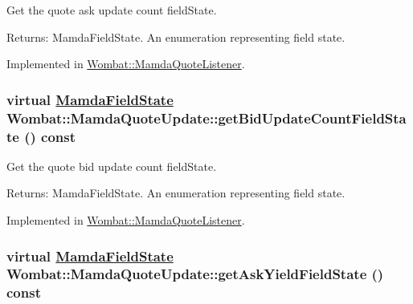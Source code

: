 Get the quote ask update count field\-State. 

\begin{Desc}
\item[Returns:]Mamda\-Field\-State. An enumeration representing field state. \end{Desc}


Implemented in \hyperlink{classWombat_1_1MamdaQuoteListener_a9d06f74666624d69ff4e6303a626532}{Wombat::Mamda\-Quote\-Listener}.\hypertarget{classWombat_1_1MamdaQuoteUpdate_896f9662777d9612562a1d5aa4d6afd3}{
\subsubsection[getBidUpdateCountFieldState]{\setlength{\rightskip}{0pt plus 5cm}virtual \hyperlink{namespaceWombat_93aac974f2ab713554fd12a1fa3b7d2a}{Mamda\-Field\-State} Wombat::Mamda\-Quote\-Update::get\-Bid\-Update\-Count\-Field\-State () const}}
\label{classWombat_1_1MamdaQuoteUpdate_896f9662777d9612562a1d5aa4d6afd3}


Get the quote bid update count field\-State. 

\begin{Desc}
\item[Returns:]Mamda\-Field\-State. An enumeration representing field state. \end{Desc}


Implemented in \hyperlink{classWombat_1_1MamdaQuoteListener_94564b543817c0a2c9a0711ae7e63ad5}{Wombat::Mamda\-Quote\-Listener}.\hypertarget{classWombat_1_1MamdaQuoteUpdate_8ab3bd8d0aaccb6c6361ad5efb17a996}{
\subsubsection[getAskYieldFieldState]{\setlength{\rightskip}{0pt plus 5cm}virtual \hyperlink{namespaceWombat_93aac974f2ab713554fd12a1fa3b7d2a}{Mamda\-Field\-State} Wombat::Mamda\-Quote\-Update::get\-Ask\-Yield\-Field\-State () const}}
\label{classWombat_1_1MamdaQuoteUpdate_8ab3bd8d0aaccb6c6361ad5efb17a996}


